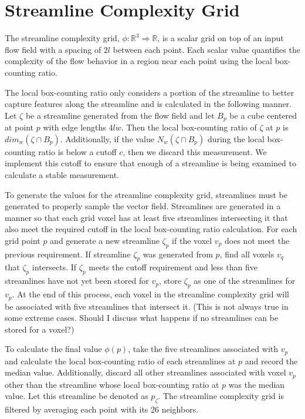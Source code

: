\documentclass{egpubl}
\newcommand {\emath}[1]  {\ensuremath{#1}}
\newcommand {\R}         {\emath{\mathbb{R}}}        %
\newcommand {\Real}[1]   {\emath{\mathbb{R}^{#1}}}   %
\newcommand {\Rthree}    {\Real{3}}                  %
\begin{document}
\section{Streamline Complexity Grid} \label{sec:scg}

The streamline complexity grid, $\phi : \Rthree \Rightarrow \R$, is a scalar grid on top of an input flow field with a spacing of $2l$ between each point. 
Each scalar value quantifies the complexity of the flow behavior in a region near each point using the local box-counting ratio.

The local box-counting ratio only considers a portion of the streamline to better capture features along the streamline and is calculated in the following manner.
Let $\zeta$ be a streamline generated from the flow field and let $B_{p}$ be a cube centered at point $p$ with edge lengths $4l \dot w$.
Then the local box-counting ratio of $\zeta$ at $p$ is $dim_{w}(\zeta \cap B_{p})$.
Additionally, if the value $N_{w}(\zeta \cap B_{p})$ during the local box-counting ratio is below a cutoff $c$, then we discard this measurement.
We implement this cutoff to ensure that enough of a streamline is being examined to calculate a stable measurement.

To generate the values for the streamline complexity grid, streamlines must be generated to properly sample the vector field.
Streamlines are generated in a manner so that each grid voxel has at least five streamlines intersecting it that also meet the required cutoff in the local box-counting ratio calculation.
For each grid point $p$ and generate a new streamline $\zeta_{p}$ if the voxel $v_{p}$ does not meet the previous requirement.
If streamline $\zeta_{p}$ was generated from $p$, find all voxels $v_{q}$ that $\zeta_{p}$ intersects.
If $\zeta_{p}$ meets the cutoff requirement and less than five streamlines have not yet been stored for $v_p$, store $\zeta_p$ as one of the streamlines for $v_p$.
At the end of this process, each voxel in the streamline complexity grid will be associated with five streamlines that intersect it.
(This is not always true in some extreme cases. Should I discuss what happens if no streamlines can be stored for a voxel?)

To calculate the final value $\phi(p)$, take the five streamlines associated with $v_{p}$ and calculate the local box-counting ratio of each streamlines at $p$ and record the median value.
Additionally, discard all other streamlines associated with voxel $v_p$ other than the streamline whose local box-counting ratio at $p$ was the median value.
Let this streamline be denoted as $p_{\zeta}$.
The streamline complexity grid is filtered by averaging each point with its 26 neighbors.
\end{document}
